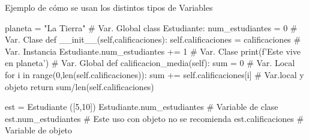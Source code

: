 \documentclass[10pt,envcountsect,spanish]{beamer}
\begin{document}
\begin{frame}[fragile]{Ejemplo de cómo se usan los distintos tipos de Variables}
\small
\begin{pyconsole}[][frame=single, fontsize=\scriptsize]
planeta = "La Tierra"                        # Var. Global
class Estudiante:
    num_estudiantes = 0                      # Var. Clase
    def __init__(self,calificaciones):
        self.calificaciones = calificaciones # Var. Instancia
        Estudiante.num_estudiantes += 1      # Var. Clase
        print(f'Este vive en {planeta}')    # Var. Global
    def calificacion_media(self):
        sum = 0                              # Var. Local
        for i in range(0,len(self.calificaciones)):
            sum += self.calificaciones[i]    # Var.local y objeto
        return sum/len(self.calificaciones)
 
est = Estudiante ([5,10])
Estudiante.num_estudiantes  # Variable de clase
est.num_estudiantes         # Este uso con objeto no se recomienda
est.calificaciones          # Variable de objeto
\end{pyconsole}
\end{frame}
\end{document}

